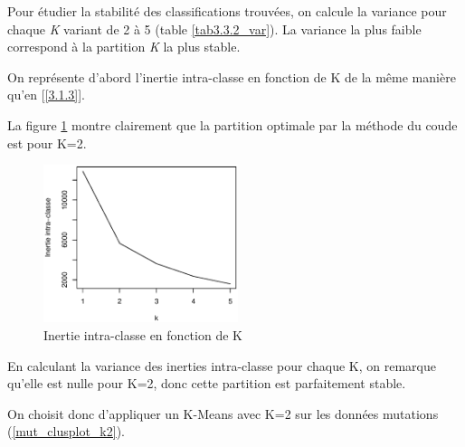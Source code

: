 \documentclass{article}
\begin{document}
Pour étudier la stabilité des classifications trouvées, on calcule la variance pour chaque \textit{K} variant de 2 à 5 (table \ref{tab3.3.2_var}). La variance la plus faible correspond à la partition \textit{K} la plus stable.

On représente d'abord l'inertie intra-classe en fonction de K de la même manière qu'en [\ref{3.1.3}].

La figure \ref{mut_elbow} montre clairement que la partition optimale par la méthode du coude est pour K=2.
\begin{figure}[H]
\centering
\includegraphics[width=5.7cm]{./img/mut_elbow.eps}
\caption{Inertie intra-classe en fonction de K}
\label{mut_elbow}
\end{figure}


En calculant la variance des inerties intra-classe pour chaque K, on remarque qu'elle est nulle pour K=2, donc cette partition est parfaitement stable.

On choisit donc d'appliquer un K-Means avec K=2 sur les données mutations (\ref{mut_clusplot_k2}).
\end{document}
